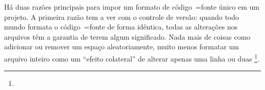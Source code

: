 \begin{citacao}
    Há duas razões principais para impor um formato de código~=fonte único em um projeto.
    A primeira razão tem a ver com o controle de versão:
    quando todo mundo formata o código~=fonte de forma idêntica,
    todas as alterações nos arquivos têm a garantia de terem algum significado.
    Nada mais de coisas como adicionar ou
    remover um espaço aleatoriamente,
    muito menos formatar um arquivo inteiro como um ``efeito colateral'' de alterar apenas uma linha ou
    duas \cite[tradução nossa]{Geukens}\footnote{
    }.
\end{citacao}


